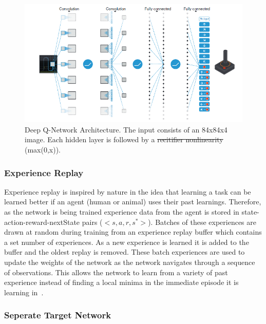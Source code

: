 \documentclass[12pt,american]{report}
\providecommand{\DIFaddtex}[1]{{\protect\color{blue}\uwave{#1}}} %
\providecommand{\DIFdeltex}[1]{{\protect\color{red}\sout{#1}}}                      %
\providecommand{\DIFaddFL}[1]{\DIFadd{#1}} %
\providecommand{\DIFdelFL}[1]{\DIFdel{#1}} %
\providecommand{\DIFaddbeginFL}{} %
\providecommand{\DIFaddendFL}{} %
\providecommand{\DIFdelbeginFL}{} %
\providecommand{\DIFdelendFL}{} %
\providecommand{\DIFadd}[1]{\texorpdfstring{\DIFaddtex{#1}}{#1}} %
\providecommand{\DIFdel}[1]{\texorpdfstring{\DIFdeltex{#1}}{}} %
\newcommand{\DIFscaledelfig}{0.5}
\newlength{\DIFdelgraphicswidth} %
\newlength{\DIFdelgraphicsheight} %
\newcommand{\DIFaddincludegraphics}[2][]{{\color{blue}\fbox{\DIFOincludegraphics[#1]{#2}}}} %
\newcommand{\DIFdelincludegraphics}[2][]{%
\sbox{\DIFdelgraphicsbox}{\DIFOincludegraphics[#1]{#2}}%
\settoboxwidth{\DIFdelgraphicswidth}{\DIFdelgraphicsbox} %
\settoboxtotalheight{\DIFdelgraphicsheight}{\DIFdelgraphicsbox} %
\scalebox{\DIFscaledelfig}{%
\parbox[b]{\DIFdelgraphicswidth}{\usebox{\DIFdelgraphicsbox}\\[-\baselineskip] \rule{\DIFdelgraphicswidth}{0em}}\llap{\resizebox{\DIFdelgraphicswidth}{\DIFdelgraphicsheight}{%
\setlength{\unitlength}{\DIFdelgraphicswidth}%
\begin{picture}(1,1)%
\thicklines\linethickness{2pt} %
{\color[rgb]{1,0,0}\put(0,0){\framebox(1,1){}}}%
{\color[rgb]{1,0,0}\put(0,0){\line( 1,1){1}}}%
{\color[rgb]{1,0,0}\put(0,1){\line(1,-1){1}}}%
\end{picture}%
}\hspace*{3pt}}} %
} %
\DeclareRobustCommand{\DIFaddbeginFL}{\DIFOaddbeginFL \let\includegraphics\DIFaddincludegraphics} %
\DeclareRobustCommand{\DIFaddendFL}{\DIFOaddendFL \let\includegraphics\DIFOincludegraphics} %
\DeclareRobustCommand{\DIFdelbeginFL}{\DIFOdelbeginFL \let\includegraphics\DIFdelincludegraphics} %
\DeclareRobustCommand{\DIFdelendFL}{\DIFOaddendFL \let\includegraphics\DIFOincludegraphics} %
\begin{document}
\begin{figure}
\centering
\DIFdelbeginFL %
\DIFdelendFL \DIFaddbeginFL \includegraphics[scale=.95]{images/DQN-atari.png}
\DIFaddendFL \caption{Deep Q-Network Architecture. The input consists of an 84x84x4 image. Each hidden layer is followed by a \DIFdelbeginFL \DIFdelFL{recitifier nonlinearity }\DIFdelendFL \DIFaddbeginFL \DIFaddFL{rectifier non-linearity }\DIFaddendFL (max(0,x)).~\cite{atari}}
\label{fig:DQN-atari}
\end{figure}


\subsubsection{Experience Replay}

Experience replay is inspired by nature in the idea that learning a task can be learned better if an agent (human or animal) uses their past learnings.  Therefore, as the network is being trained experience data from the agent is stored in state-action-reward-nextState pairs ($<s,a,r,s^{*}>$). Batches of these experiences are drawn at random during training from an experience replay buffer which contains a set number of experiences.  As a new experience is learned it is added to the buffer and the oldest replay is removed. These batch experiences are used to update the weights of the network as the network navigates through a sequence of observations.  This allows the network to learn from a variety of past experience instead of finding a local minima in the immediate episode it is learning in~\cite{atari}.

\subsubsection{Seperate Target Network}
\end{document}
